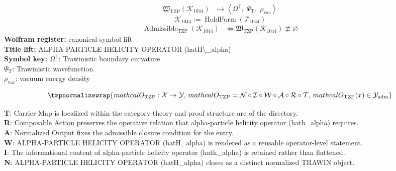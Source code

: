 \noindent
\begin{minipage}[t]{0.48\linewidth}
\begingroup
\small
\[
\begin{aligned}
\mathfrak{W}_{\mathrm{TZP}}\!\left(\mathcal{K}_{1044}\right)
&\longmapsto
\left\langle \Omega^{\mathbb{T}},\; \Psi_{\mathrm{T}},\; \rho_{\mathrm{vac}} \right\rangle
\end{aligned}
\]
\[
\mathcal{K}_{1044}
:=
\operatorname{HoldForm}\!\left(\mathcal{T}_{1044}\right)
\]
\[
\begin{aligned}
\operatorname{Admissible}_{\mathrm{TZP}}\!\left(\mathcal{K}_{1044}\right)
&\Longleftrightarrow
\mathfrak{W}_{\mathrm{TZP}}\!\left(\mathcal{K}_{1044}\right)\not\equiv\varnothing
\end{aligned}
\]
\textbf{Wolfram register:} canonical symbol lift\\
\textbf{Title lift:} ALPHA-PARTICLE HELICITY OPERATOR (hatH\textbackslash{}\_alpha)\\
\textbf{Symbol key:} \(\Omega^{\mathbb{T}}\): Trawinistic boundary curvature\\ \(\Psi_{\mathrm{T}}\): Trawinistic wavefunction\\ \(\rho_{\mathrm{vac}}\): vacuum energy density
\par
\endgroup
\end{minipage}\hfill
\begin{minipage}[t]{0.48\linewidth}
\[
\tzpnormalizewrap{mathcal{O}_{\mathrm{TZP}} : \mathcal{X} \to \mathcal{Y},\,mathcal{O}_{\mathrm{TZP}} = \mathcal{N}\circ \mathcal{I}\circ \mathcal{W}\circ \mathcal{A}\circ \mathcal{R}\circ \mathcal{T},\,mathcal{O}_{\mathrm{TZP}}(x) \in \mathcal{Y}_{\mathrm{adm}}}
\]

\small
\textbf{T}: Carrier Map is localized within the category theory and proof structure arc of the directory.\\
\textbf{R}: Composable Action preserves the operative relation that alpha-particle helicity operator (hath\_alpha) requires.\\
\textbf{A}: Normalized Output fixes the admissible closure condition for the entry.\\
\textbf{W}: ALPHA-PARTICLE HELICITY OPERATOR (hatH\_alpha) is rendered as a reusable operator-level statement.\\
\textbf{I}: The informational content of alpha-particle helicity operator (hath\_alpha) is retained rather than flattened.\\
\textbf{N}: ALPHA-PARTICLE HELICITY OPERATOR (hatH\_alpha) closes as a distinct normalized TRAWIN object.
\normalsize
\end{minipage}

